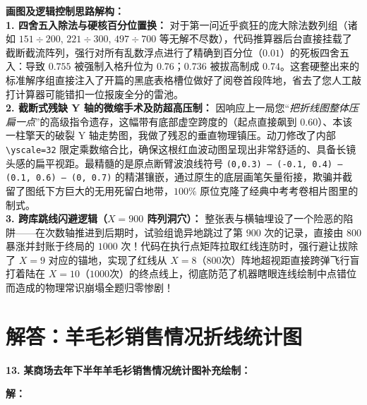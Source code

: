 \vspace{0.4cm}
{\small\color{blue!70!black}
\textbf{画图及逻辑控制思路解构：}\\
\textbf{1. 四舍五入除法与硬核百分位置换：} 对于第一问近乎疯狂的庞大除法数列组（诸如 $151 \div 200$, $221 \div 300$, $497 \div 700$ 等无解不尽数），代码推算器后台直接挂载了截断截流阵列，强行对所有乱数浮点进行了精确到百分位（$0.01$）的死板四舍五入：导致 $0.755$ 被强制入格升位为 $0.76$；$0.736$ 被拔高制成 $0.74$。这套硬整出来的标准解序组直接注入了开篇的黑底表格槽位做好了阅卷首段阵地，省去了您人工敲打计算器可能错扣一位报废全分的雷池。\\
\textbf{2. 截断式残缺 Y 轴的微缩手术及防超高压制：} 因响应上一局您“\textit{把折线图整体压扁一点}”的高级指令遗存，这幅带有底部虚空跨度的（起点直接飙到 $0.60$）、本该一柱擎天的破裂 Y 轴走势图，我做了残忍的垂直物理镇压。动刀修改了内部 \texttt{\textbackslash{}yscale=32} 限定乘数缩合比，确保这根红血波动图呈现出非常舒适的、具备长镜头感的扁平视距。最精髓的是原点断臂波浪线符号 \texttt{(0,0.3) -- (-0.1, 0.4) -- (0.1, 0.6) -- (0, 0.7)} 的精湛镶嵌，通过原生的底层画笔矢量衔接，欺骗并截留了图纸下方巨大的无用死留白地带，$100\%$ 原位克隆了经典中考考卷相片图里的制式。\\
\textbf{3. 跨库跳线闪避逻辑（$X=900$ 阵列洞穴）：} 整张表与横轴埋设了一个险恶的陷阱——在次数轴推进到后期时，试验组诡异地跳过了第 $900$ 次的记录，直接由 $800$ 暴涨并封账于终局的 $1000$ 次！代码在执行点矩阵拉取红线连防时，强行避让拔除了 $X=9$ 对应的锚地，实现了红线从 $X=8$（$800$次）阵地超视距直接跨弹飞行盲打着陆在 $X=10$（$1000$次）的终点线上，彻底防范了机器瞎眼连线绘制中点错位而造成的物理常识崩塌全题归零惨剧！
}

\newpage



\section{解答：羊毛衫销售情况折线统计图}

\vspace{0.6cm}

\textbf{\LARGE 13.} \textbf{某商场去年下半年羊毛衫销售情况统计图补充绘制：}

\vspace{0.6cm}
\textbf{解：}

